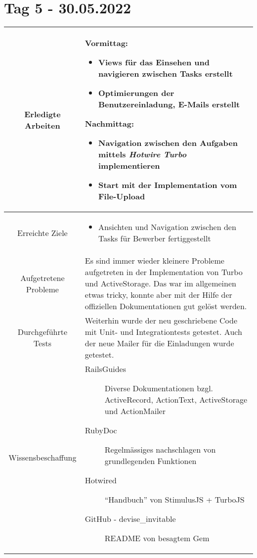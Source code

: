 \section{Tag 5 - 30.05.2022}

\begin{tabularx}{\textwidth}[H]{|c|X|}
    \hline
    Erledigte Arbeiten         &
    \textbf{Vormittag:}
    \begin{itemize}
        \item Views für das Einsehen und navigieren zwischen Tasks erstellt
        \item Optimierungen der Benutzereinladung, E-Mails erstellt
    \end{itemize}
    \textbf{Nachmittag:}
    \begin{itemize}
        \item Navigation zwischen den Aufgaben mittels \emph{Hotwire Turbo} implementieren
        \item Start mit der Implementation vom File-Upload
    \end{itemize}
    \\ \hline

    Erreichte Ziele            &
    \begin{itemize}
        \item Ansichten und Navigation zwischen den Tasks für Bewerber fertiggestellt 
    \end{itemize}
    \\ \hline

    Aufgetretene Probleme      &
    Es sind immer wieder kleinere Probleme aufgetreten in der Implementation von Turbo und ActiveStorage. Das war im allgemeinen etwas tricky,
    konnte aber mit der Hilfe der offiziellen Dokumentationen gut gelöst werden.
    \\ \hline

    Durchgeführte Tests        &
    Weiterhin wurde der neu geschriebene Code mit Unit- und Integrationtests getestet. Auch der neue Mailer für die Einladungen wurde getestet.
    \\ \hline

    Wissensbeschaffung         &
    \begin{description}
        \item[RailsGuides] Diverse Dokumentationen bzgl. ActiveRecord, ActionText, ActiveStorage und ActionMailer
        \item[RubyDoc] Regelmässiges nachschlagen von grundlegenden Funktionen
        \item[Hotwired] \enquote{Handbuch} von StimulusJS + TurboJS
        \item[GitHub - devise\_invitable] README von besagtem Gem
    \end{description}
    \\ \hline


\end{tabularx}
